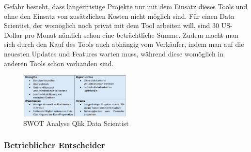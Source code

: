 \documentclass[12pt]{article}
\begin{document}
	Gefahr besteht, dass längerfristige Projekte nur mit dem Einsatz dieses Tools und ohne
	den Einsatz von zusätzlichen Kosten nicht möglich sind. Für einen Data Scientist, der
	womöglich noch privat mit dem Tool arbeiten will, sind 30 US-Dollar pro Monat nämlich
	schon eine beträchtliche Summe.
	Zudem macht man sich durch den Kauf des Tools auch abhängig vom Verkäufer, indem
	man auf die neuesten Updates und Features warten muss, während diese womöglich in
	anderen Tools schon vorhanden sind.
	\begin{figure}[h]
		\centering
		\includegraphics[width=0.5\textwidth]{SWOT3}
		\caption{SWOT Analyse Qlik Data Scientist}
	\end{figure}
	
	\subsubsection{Betrieblicher Entscheider}
	
\end{document}
